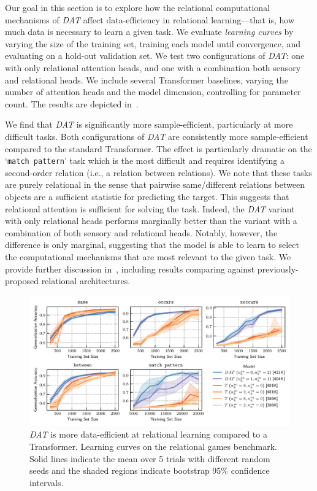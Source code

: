 Our goal in this section is to explore how the relational computational mechanisms of \textit{DAT} affect data-efficiency in relational learning---that is, how much data is necessary to learn a given task. We evaluate \textit{learning curves} by varying the size of the training set, training each model until convergence, and evaluating on a hold-out validation set. We test two configurations of \textit{DAT}: one with only relational attention heads, and one with a combination both sensory and relational heads. We include several Transformer baselines, varying the number of attention heads and the model dimension, controlling for parameter count.
The results are depicted in~.

We find that \textit{DAT} is significantly more sample-efficient, particularly at more difficult tasks. Both configurations of \textit{DAT} are consistently more sample-efficient compared to the standard Transformer. The effect is particularly dramatic on the `\texttt{match pattern}' task which is the most difficult and requires identifying a second-order relation (i.e., a relation between relations). We note that these tasks are purely relational in the sense that pairwise same/different relations between objects are a sufficient statistic for predicting the target. This suggests that relational attention is sufficient for solving the task. Indeed, the \textit{DAT} variant with only relational heads performs marginally better than the variant with a combination of both sensory and relational heads. Notably, however, the difference is only marginal, suggesting that the model is able to learn to select the computational mechanisms that are most relevant to the given task. We provide further discussion in~, including results comparing against previously-proposed relational architectures.


\begin{figure}[ht]
    \includegraphics[width=\textwidth]{figs/experiments/relgames/relgames_learning_curves_transformer_comparison.pdf}
    \caption{\textit{DAT} is more data-efficient at relational learning compared to a Transformer. Learning curves on the relational games benchmark. Solid lines indicate the mean over 5 trials with different random seeds and the shaded regions indicate bootstrap 95\% confidence intervals.}\label{fig:relgames_learning_curves}
\end{figure}

